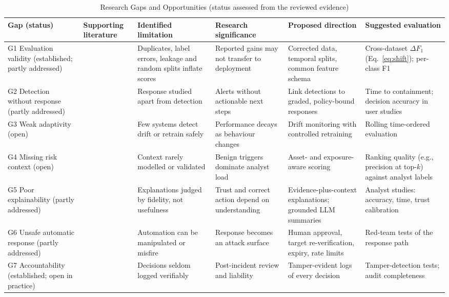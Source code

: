 \documentclass[conference]{IEEEtran}
\begin{document}
\begin{table}[t]
\caption{Research Gaps and Opportunities (status assessed from the reviewed evidence)}
\label{tab:gaps}
\centering
\footnotesize
\begin{tabularx}{\textwidth}{@{}p{1.55cm}p{2.0cm}YYYY@{}}
\toprule
\textbf{Gap (status)} & \textbf{Supporting literature} & \textbf{Identified limitation} & \textbf{Research significance} & \textbf{Proposed direction} & \textbf{Suggested evaluation} \\
\midrule
G1 Evaluation validity (established; partly addressed) & \cite{tavallaee2009detailed,engelen2021troubleshooting,arp2022dos,kapoor2023leakage,pendlebury2019tesseract} & Duplicates, label errors, leakage and random splits inflate scores & Reported gains may not transfer to deployment & Corrected data, temporal splits, common feature schema & Cross-dataset $\Delta F_1$ (Eq.~\ref{eq:shift}); per-class F1 \\
G2 Detection without response (partly addressed) & \cite{nespoli2018optimal,tilbury2024humans} & Response studied apart from detection & Alerts without actionable next steps & Link detections to graded, policy-bound responses & Time to containment; decision accuracy in user studies \\
G3 Weak adaptivity (open) & \cite{pendlebury2019tesseract,mirsky2018kitsune,layeghy2023explainable} & Few systems detect drift or retrain safely & Performance decays as behaviour changes & Drift monitoring with controlled retraining & Rolling time-ordered evaluation \\
G4 Missing risk context (open) & \cite{alahmadi2022false,aminanto2020threat,kaufhold2022cyber} & Context rarely modelled or validated & Benign triggers dominate analyst load & Asset- and exposure-aware scoring & Ranking quality (e.g., precision at top-$k$) against analyst labels \\
G5 Poor explainability (partly addressed) & \cite{warnecke2020evaluating,nadeem2023sok,neupane2022xids,ribeiro2016why} & Explanations judged by fidelity, not usefulness & Trust and correct action depend on understanding & Evidence-plus-context explanations; grounded LLM summaries & Analyst studies: accuracy, time, trust calibration \\
G6 Unsafe automatic response (partly addressed) & \cite{biggio2018wild,tilbury2024humans,greshake2023indirect} & Automation can be manipulated or misfire & Response becomes an attack surface & Human approval, target re-verification, expiry, rate limits & Red-team tests of the response path \\
G7 Accountability (established; open in practice) & \cite{schneier1999secure,tilbury2024humans} & Decisions seldom logged verifiably & Post-incident review and liability & Tamper-evident logs of every decision & Tamper-detection tests; audit completeness \\
\bottomrule
\end{tabularx}
\end{table}
\end{document}
